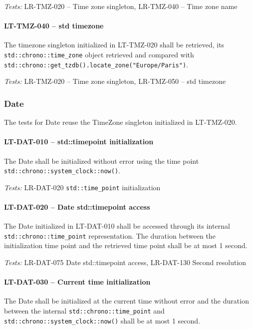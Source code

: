 \textit{Tests: } LR-TMZ-020 -- Time zone singleton,
                 LR-TMZ-040 -- Time zone name

\paragraph{LT-TMZ-040 -- std time\textunderscore zone}
The time\textunderscore zone singleton initialized in LT-TMZ-020 shall
be retrieved, its \lstinline{std::chrono::time_zone} object retrieved
and compared with
\lstinline{std::chrono::get_tzdb().locate_zone("Europe/Paris")}.


\textit{Tests: } LR-TMZ-020 -- Time zone singleton,
                 LR-TMZ-050 -- std time\textunderscore zone

\subsubsection{Date}
The tests for Date reuse the TimeZone singleton initialized
in LT-TMZ-020.

\paragraph{LT-DAT-010 -- std::time\textunderscore point initialization}
The Date shall be initialized without error using the time point
\lstinline{std::chrono::system_clock::now()}.

\textit{Tests: } LR-DAT-020 \lstinline{std::time_point} initialization

\paragraph{LT-DAT-020 -- Date std::time\textunderscore point access}
The Date initialized in LT-DAT-010 shall be accessed through its
internal \lstinline{std::chrono::time_point} representation.
The duration between the initialization time point and the retrieved
time point shall be at most 1 second.

\textit{Tests: } LR-DAT-075 Date std::time\textunderscore point access,
LR-DAT-130 Second resolution

\paragraph{LT-DAT-030 -- Current time initialization}
The Date shall be initialized at the current time without error
and the duration between the internal \lstinline{std::chrono::time_point}
and \lstinline{std::chrono::system_clock::now()} shall be at most 1 second.

